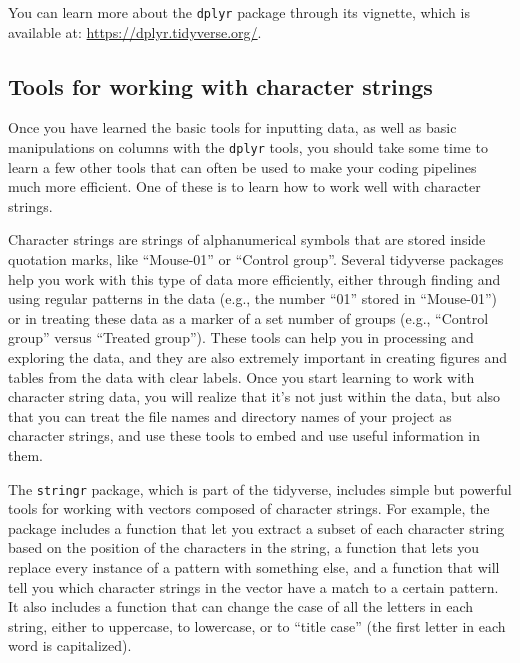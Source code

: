 \documentclass[]{tufte-book}
\begin{document}
You can learn more about the \texttt{dplyr} package through its vignette, which is
available at: \url{https://dplyr.tidyverse.org/}.

\subsection{Tools for working with character strings}\label{tools-for-working-with-character-strings}

Once you have learned the basic tools for inputting data, as well as basic
manipulations on columns with the \texttt{dplyr} tools, you should take some time to
learn a few other tools that can often be used to make your coding pipelines
much more efficient. One of these is to learn how to work well with character
strings.

Character strings are strings of alphanumerical symbols that are stored
inside quotation marks, like ``Mouse-01'' or ``Control group''. Several tidyverse
packages help you work with this type of data more efficiently, either through
finding and using regular patterns in the data (e.g., the number ``01'' stored in
``Mouse-01'') or in treating these data as a marker of a set number of groups
(e.g., ``Control group'' versus ``Treated group''). These tools can help you in
processing and exploring the data, and they are also extremely important in
creating figures and tables from the data with clear labels. Once you start
learning to work with character string data, you will realize that it's not just
within the data, but also that you can treat the file names and directory names
of your project as character strings, and use these tools to embed and use
useful information in them.

The \texttt{stringr} package, which is part of the tidyverse, includes simple but
powerful tools for working with vectors composed of character strings. For
example, the package includes a function that let you extract a subset of each
character string based on the position of the characters in the string, a
function that lets you replace every instance of a pattern with something
else, and a function that will tell you which character strings in the vector
have a match to a certain pattern. It also includes a function that can change
the case of all the letters in each string, either to uppercase, to lowercase,
or to ``title case'' (the first letter in each word is capitalized).
\end{document}
